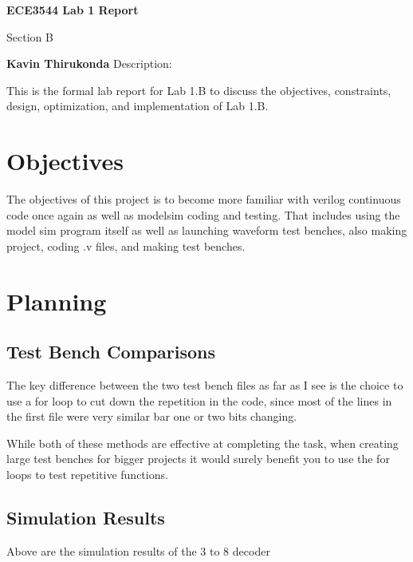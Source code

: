 \documentclass{article}
\begin{document}
\begin{center}
    \vspace*{1cm}
    \Huge
    \textbf{ECE3544 Lab 1 Report}
    
    \vspace{0.5cm}
    \LARGE
    Section B
    
    \vspace{1.5cm}
    \textbf{Kavin Thirukonda}
    \vfill
    \small
    Description:
    
    This is the formal lab report for Lab 1.B to discuss the objectives, constraints, design, optimization, and implementation of Lab 1.B.
    \vspace{10cm}
\end{center}
\newpage
\section{Objectives}
The objectives of this project is to become more familiar with verilog continuous code once again as well as modelsim coding and testing. That includes using the model sim program itself as well as launching waveform test benches, also making project, coding .v files, and making test benches.
\section{Planning}
\subsection{Test Bench Comparisons}
The key difference between the two test bench files as far as I see is the choice to use a for loop to cut down the repetition in the code, since most of the lines in the first file were very similar bar one or two bits changing.

While both of these methods are effective at completing the task, when creating large test benches for bigger projects it would surely benefit you to use the for loops to test repetitive functions.
\subsection{Simulation Results}
\begin{center}
    
    Above are the simulation results of the 3 to 8 decoder
\end{center}
\end{document}
